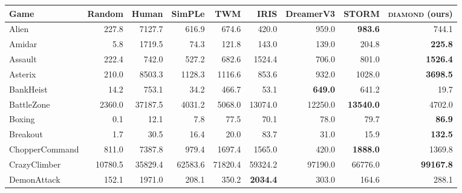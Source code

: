 \begin{table*}[h]
\begin{center}
\begin{small}
{\begin{tabular}{lrr rrrrrr}
Game                 &  Random    &  Human     &  SimPLe    &  TWM                &  IRIS              &  DreamerV3          &  STORM              &  \textsc{diamond} (ours)  \\
\midrule
Alien                &  227.8     &  7127.7    &  616.9     &  674.6              &  420.0             &  959.0              &  \textbf{983.6}     &  744.1                    \\
Amidar               &  5.8       &  1719.5    &  74.3      &  121.8              &  143.0             &  139.0              &  204.8              &  \textbf{225.8}           \\
Assault              &  222.4     &  742.0     &  527.2     &  682.6              &  1524.4            &  706.0              &  801.0              &  \textbf{1526.4}          \\
Asterix              &  210.0     &  8503.3    &  1128.3    &  1116.6             &  853.6             &  932.0              &  1028.0             &  \textbf{3698.5}          \\
BankHeist            &  14.2      &  753.1     &  34.2      &  466.7              &  53.1              &  \textbf{649.0}     &  641.2              &  19.7                     \\
BattleZone           &  2360.0    &  37187.5   &  4031.2    &  5068.0             &  13074.0           &  12250.0            &  \textbf{13540.0}   &  4702.0                   \\
Boxing               &  0.1       &  12.1      &  7.8       &  77.5               &  70.1              &  78.0               &  79.7               &  \textbf{86.9}            \\
Breakout             &  1.7       &  30.5      &  16.4      &  20.0               &  83.7              &  31.0               &  15.9               &  \textbf{132.5}           \\
ChopperCommand       &  811.0     &  7387.8    &  979.4     &  1697.4             &  1565.0            &  420.0              &  \textbf{1888.0}    &  1369.8                   \\
CrazyClimber         &  10780.5   &  35829.4   &  62583.6   &  71820.4            &  59324.2           &  97190.0            &  66776.0            &  \textbf{99167.8}         \\
DemonAttack          &  152.1     &  1971.0    &  208.1     &  350.2              &  \textbf{2034.4}   &  303.0              &  164.6              &  288.1                    \\

\end{tabular}}
\end{small}
\end{center}
\end{table*}
